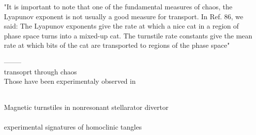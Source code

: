 "It is important to note that one of the fundamental measures of chaos, the Lyapunov exponent is not usually a good measure for transport. In Ref. 86, we said: The Lyapunov exponents give the rate at which a nice cat in a region of phase space turns into a mixed-up cat. The turnstile rate constants give the mean rate at which bits of the cat are transported to regions of the phase space"


--------
\\[10pt]
transoprt through chaos \cite{easton_transport_1991}
\\[10pt]

Those have been experimentaly observed in

\\[10pt]
Magnetic turnstiles in nonresonant stellarator divertor
\\[10pt]

\\[10pt]
experimental signatures of homoclinic tangles \cite{evans_experimental_2005}
\\[10pt]